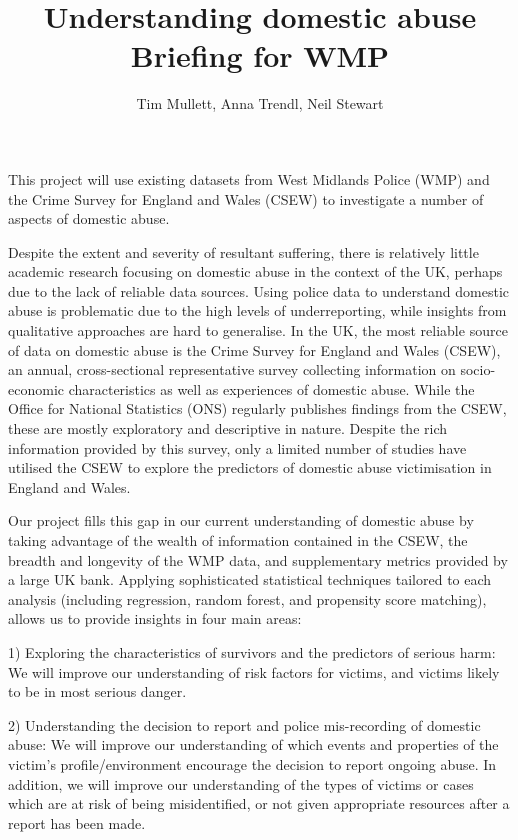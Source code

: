 \documentclass[11pt, a4paper]{article}
\begin{document}
\title{Understanding domestic abuse\\Briefing for WMP}
\author{Tim Mullett, Anna Trendl, Neil Stewart}
\date{}
\maketitle

This project will use existing datasets from West Midlands Police (WMP) and the Crime Survey for England and Wales (CSEW) to investigate a number of aspects of domestic abuse.

Despite the extent and severity of resultant suffering, there is relatively little academic research focusing on domestic abuse in the context of the UK, perhaps due to the lack of reliable data sources. Using police data to understand domestic abuse is problematic due to the high levels of underreporting, while insights from qualitative approaches are hard to generalise. In the UK, the most reliable source of data on domestic abuse is the Crime Survey for England and Wales (CSEW), an annual, cross-sectional representative survey collecting information on socio-economic characteristics as well as experiences of domestic abuse.  While the Office for National Statistics (ONS) regularly publishes findings from the CSEW, these are mostly exploratory and descriptive in nature. Despite the rich information provided by this survey, only a limited number of studies have utilised the CSEW to explore the predictors of domestic abuse victimisation in England and Wales. 

Our project fills this gap in our current understanding of domestic abuse by taking advantage of the wealth of information contained in the CSEW, the breadth and longevity of the WMP data, and supplementary metrics provided by a large UK bank. Applying sophisticated statistical techniques tailored to each analysis (including regression, random forest, and propensity score matching), allows us to provide insights in four main areas:

1) Exploring the characteristics of survivors and the predictors of serious harm: We will improve our understanding of risk factors for victims, and victims likely to be in most serious danger.

2) Understanding the decision to report and police mis-recording of domestic abuse: We will improve our understanding of which events and properties of the victim's profile/environment encourage the decision to report ongoing abuse. In addition, we will improve our understanding of the types of victims or cases which are at risk of being misidentified, or not given appropriate resources after a report has been made.
\end{document}
